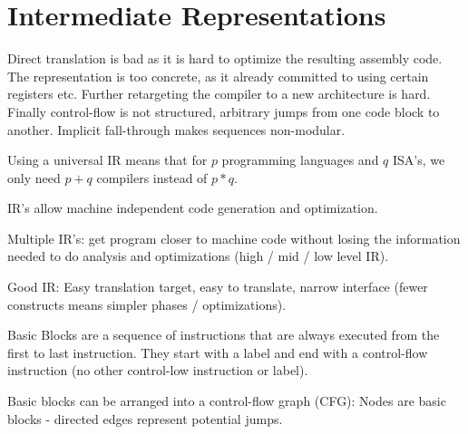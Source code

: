 \section*{Intermediate Representations}

Direct translation is bad as it is hard to optimize the resulting assembly code. The representation is too concrete, as it already committed to using certain registers etc. Further retargeting the compiler to a new architecture is hard. Finally control-flow is not structured, arbitrary jumps from one code block to another. Implicit fall-through makes sequences non-modular. \medskip

Using a universal IR means that for $p$ programming languages and $q$ ISA's, we only need $p + q$ compilers instead of $p * q$. \medskip

IR's allow machine independent code generation and optimization.\medskip
	
Multiple IR's: get program closer to machine code without losing the information needed to do analysis and optimizations (high / mid / low level IR).\medskip
		
Good IR: Easy translation target, easy to translate, narrow interface (fewer constructs means simpler phases / optimizations).\medskip
	
Basic Blocks are a sequence of instructions that are always executed from the first to last instruction. They start with a label and end with a control-flow instruction (no other control-low instruction or label).\medskip
	
Basic blocks can be arranged into a control-flow graph (CFG): Nodes are basic blocks - directed edges represent potential jumps.
